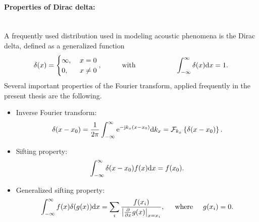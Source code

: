 \paragraph{Properties of Dirac delta:}\mbox{} \\
A frequently used distribution used in modeling acoustic phenomena is the Dirac delta, defined as a generalized function
\begin{equation}
\delta(x) = 
\begin{cases}
\infty, & \hspace{1mm} x = 0\\
0, & \hspace{1mm}  x \neq 0
\end{cases},
\hspace{1cm}
\text{with}
\hspace{2cm}
\int_{-\infty}^{\infty} \delta(x) \mathrm{d} x = 1.
\end{equation}
Several important properties of the Fourier transform, applied frequently in the present thesis are the following.
\begin{itemize}
\item Inverse Fourier transform:
\begin{equation}
\delta(x-x_0) = \frac{1}{2\pi} \int_{-\infty}^{\infty} \mathrm{e}^{-\mathrm{j} k_x (x-x_0)} \mathrm{d} k_x =  \mathcal{F}_{k_x} \left\{ \delta( x-x_0 ) \right\}.
\end{equation}
\item Sifting property:
\begin{equation}
\int_{-\infty}^{\infty} \delta(x-x_0) f(x) \mathrm{d} x = f(x_0).
\end{equation}
\item Generalized sifting property:
\begin{equation}
\int_{-\infty}^{\infty} f(x) \delta(g(x)) \mathrm{d} x = \sum_{i} \frac{f(x_i)}{\left| \frac{\partial}{\partial x} g(x) \right|_{x = x_i}}, \hspace{5mm} \text{where} \hspace{5mm} g(x_i) = 0.
\end{equation} 
\end{itemize}
